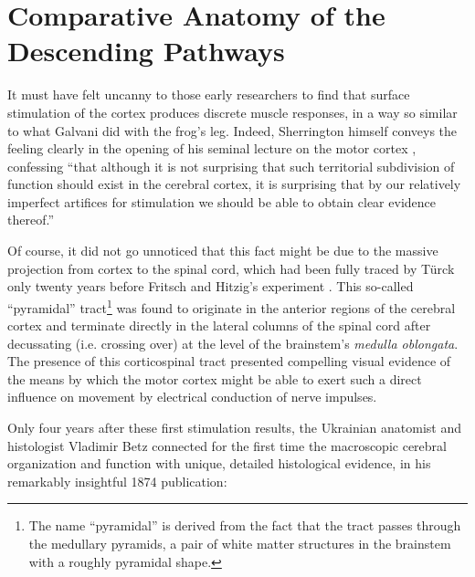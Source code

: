 \section{Comparative Anatomy of the Descending Pathways}

It must have felt uncanny to those early researchers to find that surface stimulation of the cortex produces discrete muscle responses, in a way so similar to what Galvani did with the frog's leg. Indeed, Sherrington himself conveys the feeling clearly in the opening of his seminal lecture on the motor cortex \cite[p.271]{Sherrington1906}, confessing ``that although it is not surprising that such territorial subdivision of function should exist in the cerebral cortex, it is surprising that by our relatively imperfect artifices for stimulation we should be able to obtain clear evidence thereof.''

Of course, it did not go unnoticed that this fact might be due to the massive projection from cortex to the spinal cord, which had been fully traced by Türck only twenty years before Fritsch and Hitzig's experiment \cite{Nathan1955}. This so-called ``pyramidal'' tract\footnote{The name ``pyramidal'' is derived from the fact that the tract passes through the medullary pyramids, a pair of white matter structures in the brainstem with a roughly pyramidal shape.} was found to originate in the anterior regions of the cerebral cortex and terminate directly in the lateral columns of the spinal cord after decussating (i.e. crossing over) at the level of the brainstem's \emph{medulla oblongata}. The presence of this corticospinal tract presented compelling visual evidence of the means by which the motor cortex might be able to exert such a direct influence on movement by electrical conduction of nerve impulses.

Only four years after these first stimulation results, the Ukrainian anatomist and histologist Vladimir Betz connected for the first time the macroscopic cerebral organization and function with unique, detailed histological evidence, in his remarkably insightful 1874 publication:

